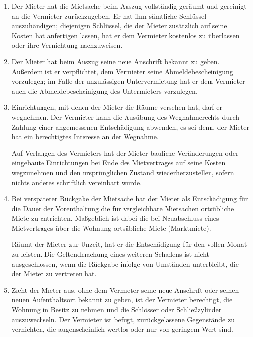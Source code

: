 \documentclass{scrreprt}[12pt,a4paper,twoside,duplex]
\begin{document}
\begin{contract}
	\begin{enumerate}
		\item Der Mieter hat die Mietsache beim Auszug vollständig geräumt und gereinigt an die Vermieter zurückzugeben. Er hat ihm sämtliche Schlüssel auszuhändigen; diejenigen Schlüssel, die der Mieter zusätzlich auf seine Kosten hat anfertigen lassen, hat er dem Vermieter kostenlos zu überlassen oder ihre Vernichtung nachzuweisen.
		\item Der Mieter hat beim Auszug seine neue Anschrift bekannt zu geben. Außerdem ist er verpflichtet, dem Vermieter seine Abmeldebescheinigung vorzulegen; im Falle der unzulässigen Untervermietung hat er dem Vermieter auch die Abmeldebescheinigung des Untermieters vorzulegen.
		\item Einrichtungen, mit denen der Mieter die Räume versehen hat, darf er wegnehmen. Der Vermieter kann die Ausübung des Wegnahmerechts durch Zahlung einer angemessenen Entschädigung abwenden, es sei denn, der Mieter hat ein berechtigtes Interesse an der Wegnahme.

		Auf Verlangen des Vermieters hat der Mieter bauliche Veränderungen oder eingebaute Einrichtungen bei Ende des Mietvertrages auf seine Kosten wegzunehmen und den ursprünglichen Zustand wiederherzustellen, sofern nichts anderes schriftlich vereinbart wurde.
		\item Bei verspäteter Rückgabe der Mietsache hat der Mieter als Entschädigung für die Dauer der Vorenthaltung die für vergleichbare Mietsachen ortsübliche Miete zu entrichten. Maßgeblich ist dabei die bei Neuabschluss eines Mietvertrages über die Wohnung ortsübliche Miete (Marktmiete).

		Räumt der Mieter zur Unzeit, hat er die Entschädigung für den vollen Monat zu leisten. Die Geltendmachung eines weiteren Schadens ist nicht ausgeschlossen, wenn die Rückgabe infolge von Umständen unterbleibt, die der Mieter zu vertreten hat.
		\item Zieht der Mieter aus, ohne dem Vermieter seine neue Anschrift oder seinen neuen Aufenthaltsort bekannt zu geben, ist der Vermieter berechtigt, die Wohnung in Besitz zu nehmen und die Schlösser oder Schließzylinder auszuwechseln. Der Vermieter ist befugt, zurückgelassene Gegenstände zu vernichten, die augenscheinlich wertlos oder nur von geringem Wert sind.
	\end{enumerate}
\end{contract}
\end{document}
